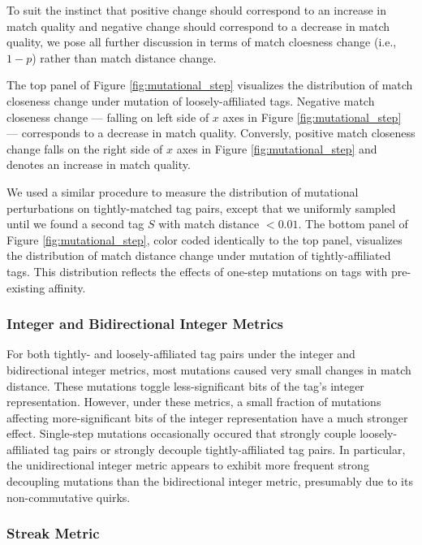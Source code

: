 To suit the instinct that positive change should correspond to an increase in match quality and negative change should correspond to a decrease in match quality, we pose all further discussion in terms of match cloesness change (i.e., $1 - p$) rather than match distance change.

The top panel of Figure \ref{fig:mutational_step} visualizes the distribution of match closeness change under mutation of loosely-affiliated tags.
Negative match closeness change --- falling on left side of $x$ axes in Figure \ref{fig:mutational_step} --- corresponds to a decrease in match quality.
Conversly, positive match closeness change falls on the right side of $x$ axes in Figure \ref{fig:mutational_step} and denotes an increase in match quality.

We used a similar procedure to measure the distribution of mutational perturbations on tightly-matched tag pairs, except that we uniformly sampled until we found a second tag $S$ with match distance $< 0.01$.
The bottom panel of Figure \ref{fig:mutational_step}, color coded identically to the top panel, visualizes the distribution of match distance change under mutation of tightly-affiliated tags.
This distribution reflects the effects of one-step mutations on tags with pre-existing affinity.

\subsubsection{Integer and Bidirectional Integer Metrics}

For both tightly- and loosely-affiliated tag pairs under the integer and bidirectional integer metrics, most mutations caused very small changes in match distance.
These mutations toggle less-significant bits of the tag's integer representation.
However, under these metrics, a small fraction of mutations affecting more-significant bits of the integer representation have a much stronger effect.
Single-step mutations occasionally occured that strongly couple loosely-affiliated tag pairs or strongly decouple tightly-affiliated tag pairs.
In particular, the unidirectional integer metric appears to exhibit more frequent strong decoupling mutations than the bidirectional integer metric, presumably due to its non-commutative quirks.

\subsubsection{Streak Metric}

